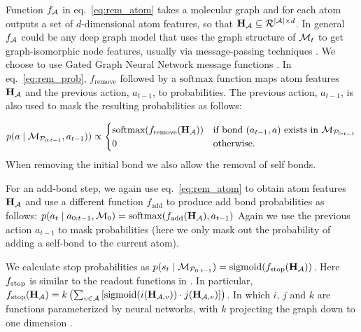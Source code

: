 Function $f_{{\mathcal{A}}}$ in eq.~\eqref{eq:rem_atom} takes a molecular graph and for each atom outputs a set of $d$-dimensional atom features, so that ${\mathbf{H}}_{{\mathcal{A}}} \subseteq \mathcal{R}^{|{\mathcal{A}}| \times d}$. 
In general $f_{{\mathcal{A}}}$ could be any deep graph model that uses the graph structure of ${\mathcal{M}}_t$ to get graph-isomorphic node features, usually via message-passing techniques \citep{gilmer2017neural}. We choose to use Gated Graph Neural Network message functions \citep{li2016gated}.
In eq.~\eqref{eq:rem_prob}, $f_{\textrm{remove}}$ followed by a $\mbox{softmax}$ function maps atom features ${\mathbf{H}}_{{\mathcal{A}}}$ and the previous action, $a_{t-1}$, to probabilities. The previous action, $a_{t-1}$, is also used to mask the resulting probabilities as follows:

\begin{align}
p(a \mid {\mathcal{M}}_{{\mathcal{P}}_{0:t-1}}, a_{t-1})) \propto 
\begin{cases}
\mbox{softmax}(f_{\textrm{remove}}({\mathbf{H}}_{{\mathcal{A}}})) & \mbox{if bond } (a_{t-1},a) \mbox{ exists in } {\mathcal{M}}_{{\mathcal{P}}_{0:t-1}} \\
0 & \mbox{otherwise}. \nonumber
\end{cases}
\end{align}
When removing the initial bond we also allow the removal of self bonds.

For an add-bond step, we again use eq.~\eqref{eq:rem_atom} to obtain atom features ${\mathbf{H}}_{{\mathcal{A}}}$ and use a different function $f_{\textrm{add}}$ to produce add bond probabilities as follows: $p(a_t \mid a_{0:t-1}, {\mathcal{M}}_0) = \mbox{softmax}(f_{\textrm{add}}({\mathbf{H}}_{{\mathcal{A}}}), a_{t-1})$
Again we use the previous action $a_{t-1}$ to mask probabilities (here we only mask out the probability of adding a self-bond to the current atom).

We calculate stop probabilities as 
$p(s_t \mid {\mathcal{M}}_{{\mathcal{P}}_{0:t-1}} ) = \mbox{sigmoid}(f_{\textrm{stop}}({\mathbf{H}}_{{\mathcal{A}}}))$.
Here $f_{\textrm{stop}}$ is similar to the readout functions in \citet[eq. 4]{gilmer2017neural}. In particular,
$f_{\textrm{stop}}({\mathbf{H}}_{{\mathcal{A}}}) = k \left( \sum_{v \in {\mathcal{A}}} \left[ \mbox{sigmoid}(i({\mathbf{H}}_{{\mathcal{A}},v})) \cdot j({\mathbf{H}}_{{\mathcal{A}},v}) \right] \right)$.
In which $i$, $j$ and $k$ are functions parameterized by neural networks, with $k$ projecting the graph down to one dimension .


